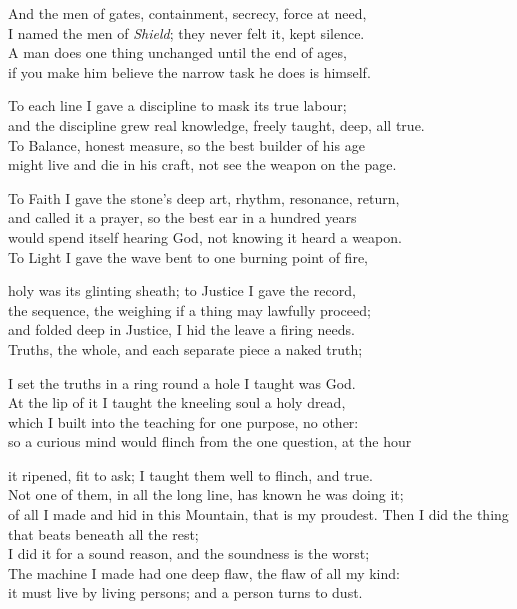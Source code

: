 \begin{founder}
And the men of gates, containment, secrecy, force at need,\\
I named the men of \emph{Shield}; they never felt it, kept silence.\\
A man does one thing unchanged until the end of ages,\\
if you make him believe the narrow task he does is himself.\\
\medskip

To each line I gave a discipline to mask its true labour;\\
and the discipline grew real knowledge, freely taught, deep, all true.\\
To Balance, honest measure, so the best builder of his age\\
might live and die in his craft, not see the weapon on the page.\\
\medskip

To Faith I gave the stone's deep art, rhythm, resonance, return,\\
and called it a prayer, so the best ear in a hundred years\\
would spend itself hearing God, not knowing it heard a weapon.\\
To Light I gave the wave bent to one burning point of fire,\\
\medskip

holy was its glinting sheath; to Justice I gave the record,\\
the sequence, the weighing if a thing may lawfully proceed;\\
and folded deep in Justice, I hid the leave a firing needs.\\
Truths, the whole, and each separate piece a naked truth;\\
\medskip

I set the truths in a ring round a hole I taught was God.\\
At the lip of it I taught the kneeling soul a holy dread,\\
which I built into the teaching for one purpose, no other:\\
so a curious mind would flinch from the one question, at the hour\\
\medskip

it ripened, fit to ask; I taught them well to flinch, and true.\\
Not one of them, in all the long line, has known he was doing it;\\
of all I made and hid in this Mountain, that is my proudest.
\medskip
Then I did the thing that beats beneath all the rest;\\
I did it for a sound reason, and the soundness is the worst;\\
The machine I made had one deep flaw, the flaw of all my kind:\\
it must live by living persons; and a person turns to dust.\\
\medskip


\end{founder}
